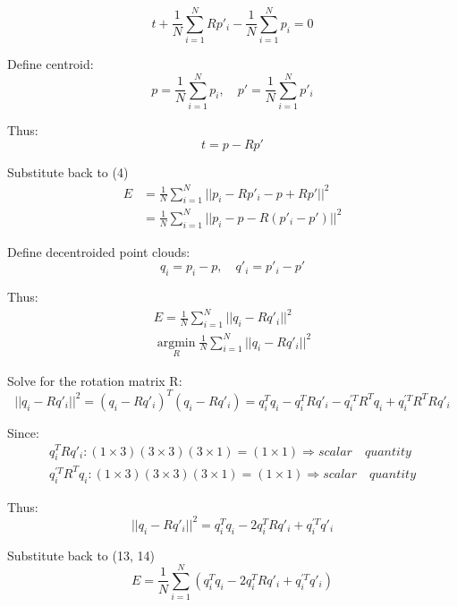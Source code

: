 \documentclass{article}
\begin{document}
\begin{equation}
t+\frac{1}{N}\sum^{N}_{i=1}Rp'_i - \frac{1}{N}\sum^{N}_{i=1}p_i=0
\end{equation}
\par
Define centroid:
\begin{equation}
p = \frac{1}{N}\sum_{i=1}^{N}p_i, \quad p' = \frac{1}{N}\sum_{i=1}^{N}p'_i
\end{equation}
\par
Thus:
\begin{equation}
t = p - Rp'
\end{equation}
\par
Substitute back to (4)
\begin{align}
E&=\frac{1}{N}\sum^{N}_{i=1}||p_i - Rp'_i -p+Rp'||^2\\
&=\frac{1}{N}\sum^{N}_{i=1}||p_i - p- R(p'_i -p')||^2
\end{align}
\par
Define decentroided point clouds:
\begin{equation}
q_i=p_i-p, \quad q'_i=p'_i-p'
\end{equation}
\par
Thus:
\begin{gather}
    E = \frac{1}{N}\sum^{N}_{i=1}||q_i - Rq'_i||^2\\
    \mathop{\arg\min}\limits_{R}\frac{1}{N}\sum^{N}_{i=1}||q_i - Rq'_i||^2
\end{gather}
\par
Solve for the rotation matrix R:
\begin{equation}
||q_i - Rq'_i||^2 = (q_i - Rq'_i)^T(q_i - Rq'_i) = q_i^Tq_i - q_i^TRq'_i - q_i^{\prime T}R^Tq_i + q_i^{\prime T}R^TRq'_i
\end{equation}
\par
Since:
\begin{gather}
    q_i^TRq'_i: (1 \times 3)(3 \times 3)(3 \times 1)=(1 \times 1) \Rightarrow scalar \quad quantity\\
    q_i^{\prime T}R^Tq_i: (1 \times 3)(3 \times 3)(3 \times 1)=(1 \times 1) \Rightarrow scalar \quad quantity
\end{gather}
\par
Thus:
\begin{equation}
    ||q_i - Rq'_i||^2 = q_i^Tq_i - 2q_i^TRq'_i + q_i^{\prime T}q'_i
\end{equation}
\par
Substitute back to (13, 14)
\begin{equation}
    E = \frac{1}{N}\sum^{N}_{i=1}(q_i^Tq_i - 2q_i^TRq'_i + q_i^{\prime T}q'_i)
\end{equation}
\end{document}
